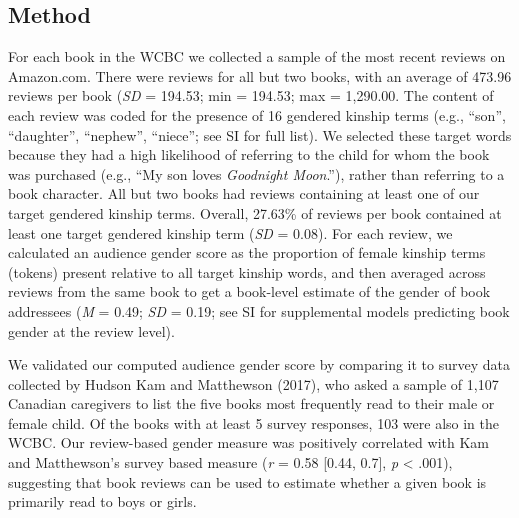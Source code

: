 \documentclass[english,,man,floatsintext]{apa6}
\begin{document}
\hypertarget{method-1}{%
\subsection{Method}\label{method-1}}

For each book in the WCBC we collected a sample of the most recent reviews on Amazon.com. There were reviews for all but two books, with an average of 473.96 reviews per book (\emph{SD} = 194.53; min = 194.53; max = 1,290.00. The content of each review was coded for the presence of 16 gendered kinship terms (e.g., \enquote{son}, \enquote{daughter}, \enquote{nephew}, \enquote{niece}; see SI for full list). We selected these target words because they had a high likelihood of referring to the child for whom the book was purchased (e.g., \enquote{My son loves \emph{Goodnight Moon}.}), rather than referring to a book character. All but two books had reviews containing at least one of our target gendered kinship terms. Overall, 27.63\% of reviews per book contained at least one target gendered kinship term (\emph{SD} = 0.08). For each review, we calculated an audience gender score as the proportion of female kinship terms (tokens) present relative to all target kinship words, and then averaged across reviews from the same book to get a book-level estimate of the gender of book addressees (\emph{M} = 0.49; \emph{SD} = 0.19; see SI for supplemental models predicting book gender at the review level).

We validated our computed audience gender score by comparing it to survey data collected by Hudson Kam and Matthewson (2017), who asked a sample of 1,107 Canadian caregivers to list the five books most frequently read to their male or female child. Of the books with at least 5 survey responses, 103 were also in the WCBC. Our review-based gender measure was positively correlated with Kam and Matthewson's survey based measure (\emph{r} = 0.58 {[}0.44, 0.7{]}, \emph{p} \textless{} .001), suggesting that book reviews can be used to estimate whether a given book is primarily read to boys or girls.
\end{document}
